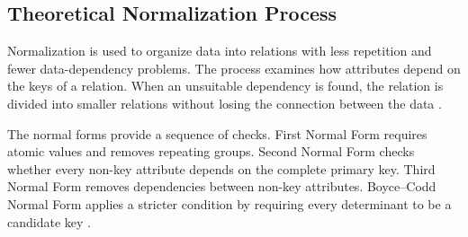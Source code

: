 \subsection{Theoretical Normalization Process}
\label{subsec:theoretical-normalization}

Normalization is used to organize data into relations with less repetition and
fewer data-dependency problems. The process examines how attributes depend on
the keys of a relation. When an unsuitable dependency is found, the relation
is divided into smaller relations without losing the connection between the
data \cite{codd1972further}.

The normal forms provide a sequence of checks. First Normal Form requires
atomic values and removes repeating groups. Second Normal Form checks whether
every non-key attribute depends on the complete primary key. Third Normal Form
removes dependencies between non-key attributes. Boyce--Codd Normal Form
applies a stricter condition by requiring every determinant to be a candidate
key \cite{kent1983five}.


